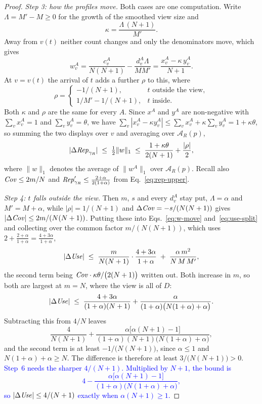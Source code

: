 \begin{proof}
{\emph{Step 3: how the profiles move.}
Both cases are one computation.
Write $\Lambda=M'-M\ge0$ for the growth of the smoothed view size and
\[
\kappa=\frac{\Lambda\,(N+1)}{M'} .
\]
Away from $v(t)$ neither count changes and only the denominators move, which gives
\[
w^A_v=\frac{c^A_v}{N(N+1)}-\frac{d^A_v\Lambda}{MM'}=\frac{x^A_v-\kappa\,y^A_v}{N+1} .
\]
At $v=v(t)$ the arrival of $t$ adds a further $\rho$ to this, where
\[
\rho=\begin{cases}-1/(N+1), & t\text{ outside the view},\\[2pt]
1/M'-1/(N+1), & t\text{ inside}.\end{cases}
\]
Both $\kappa$ and $\rho$ are the same for every $A$.
Since $x^A$ and $y^A$ are non-negative with $\sum_v x^A_v=1$ and $\sum_v y^A_v=\theta$, we have
$\sum_v|x^A_v-\kappa y^A_v|\le\sum_v x^A_v+\kappa\sum_v y^A_v=1+\kappa\theta$, so summing the two
displays over $v$ and averaging over $\mathcal{A}_R(p)$,
\begin{equation}
|\Delta\mathit{Rep}_{\gamma_R}|\;\le\;\tfrac12\|w\|_1\;\le\;\frac{1+\kappa\theta}{2(N+1)}+\frac{|\rho|}{2} ,
\label{eq:w-move}
\end{equation}
where $\|w\|_1$ denotes the average of $\|w^A\|_1$ over $\mathcal{A}_R(p)$.
Recall also $\mathit{Cov}\le2m/N$ and $\mathit{Rep}'_{\gamma_R}\le\frac{2+\alpha}{2(1+\alpha)}$ from
Eq.~\eqref{eq:rep-upper}.

\emph{Step 4: $t$ falls outside the view.}
Then $m$, $s$ and every $d^A_v$ stay put, $\Lambda=\alpha$ and $M'=M+\alpha$, while
$|\rho|=1/(N+1)$ and $\Delta\mathit{Cov}=-s/(N(N+1))$ gives $|\Delta\mathit{Cov}|\le2m/(N(N+1))$.
Putting these into Eqs.~\eqref{eq:w-move} and~\eqref{eq:use-split} and collecting over the common
factor $m/(N(N+1))$, which uses $2+\tfrac{2+\alpha}{1+\alpha}=\tfrac{4+3\alpha}{1+\alpha}$,
\[
|\Delta\mathit{Use}|\;\le\;\frac{m}{N(N+1)}\cdot\frac{4+3\alpha}{1+\alpha}\;+\;\frac{\alpha\,m^2}{N\,M\,M'},
\]
the second term being $\mathit{Cov}\cdot\kappa\theta/\big(2(N+1)\big)$ written out.
Both increase in $m$, so both are largest at $m=N$, where the view is all of $D$:
\[
|\Delta\mathit{Use}|\;\le\;\frac{4+3\alpha}{(1+\alpha)(N+1)}
+\frac{\alpha}{(1+\alpha)\big(N(1+\alpha)+\alpha\big)} .
\]
Subtracting this from $4/N$ leaves
\[
\frac{4}{N(N+1)}+\frac{\alpha\big[\alpha(N+1)-1\big]}
{(1+\alpha)(N+1)\big(N(1+\alpha)+\alpha\big)} ,
\]
and the second term is at least $-1/\big(N(N+1)\big)$, since $\alpha\le1$ and
$N(1+\alpha)+\alpha\ge N$. The difference is therefore at least $3/\big(N(N+1)\big)>0$.
\textcolor{blue}{Step~6 needs the sharper $4/(N+1)$. Multiplied by $N+1$, the bound is
\[
4-\frac{\alpha\big[\alpha(N+1)-1\big]}{(1+\alpha)\big(N(1+\alpha)+\alpha\big)} ,
\]
so $|\Delta\mathit{Use}|\le4/(N+1)$ exactly when $\alpha(N+1)\ge1$.}

}
\end{proof}
